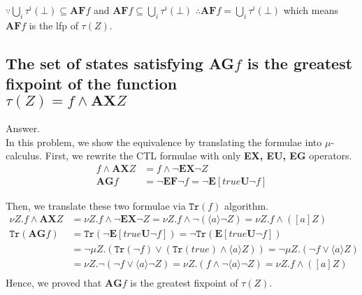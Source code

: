 \documentclass[a4paper,11pt]{article}
\theoremstyle{mytheor}
\begin{document}
\medskip \noindent
$\because \bigcup_{i}\tau^{i}(\bot) \subseteq \textbf{AF}f$ and 
$\textbf{AF}f \subseteq \bigcup_{i}\tau^{i}(\bot)$
$\therefore \textbf{AF}f = \bigcup_{i}\tau^{i}(\bot)$ which means
$\textbf{AF}f$ is the lfp of $\tau(Z)$.

\subsection{The set of states satisfying AG$f$ is the greatest fixpoint of the 
function \\ 
$\tau(\mathit{Z}) = f \wedge \textbf{AX}\mathit{Z}$}
Answer.
\smallskip \\
In this problem, we show the equivalence by translating the formulae into 
$\mu$-calculus. First, we rewrite the CTL formulae with only \textbf{EX, EU, EG}
operators.
\begin{equation*}
  \begin{array}{ll}
    f \wedge \textbf{AX}Z &= f \wedge \neg\textbf{EX} \neg Z \\
    \textbf{AG}f &= \neg \textbf{EF} \neg f = \neg \textbf{E}[ true \textbf{U} \neg f ]
  \end{array}
\end{equation*}

\noindent Then, we translate these two formulae via $\mathtt{Tr}(f)$ algorithm.
\begin{equation*}
  \begin{array}{ll}
    \nu Z. f \wedge \textbf{AX}Z 
       &= \nu Z.f \wedge \neg\textbf{EX} \neg Z 
        = \nu Z.f \wedge \neg(\langle a\rangle \neg Z)
        = \nu Z.f \wedge ([a] Z)\\
    \mathtt{Tr}(\textbf{AG}f)
       &= \mathtt{Tr}(\neg \textbf{E}[ true \textbf{U} \neg f ])
        = \neg \mathtt{Tr}(\textbf{E}[ true \textbf{U} \neg f ]) \\
       &= \neg \mu Z.(\mathtt{Tr}(\neg f) \vee (\mathtt{Tr}(true) \wedge \langle a\rangle Z) )
        = \neg \mu Z.(\neg f \vee \langle a\rangle Z)\\
       &= \nu Z.\neg(\neg f \vee \langle a\rangle \neg Z)
        = \nu Z.(f \wedge \neg \langle a\rangle \neg Z)
        = \nu Z.f \wedge ([a] Z)\\
  \end{array}
\end{equation*}
Hence, we proved that $\textbf{AG}f$ is the greatest fixpoint of $\tau(Z)$.
\end{document}
